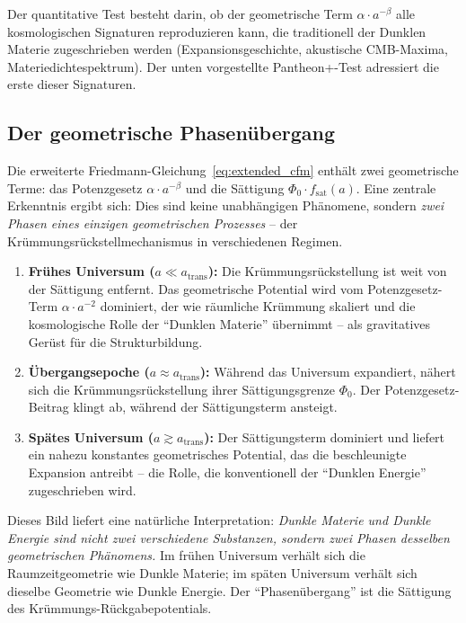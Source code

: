 \documentclass[aps,prd,twocolumn,superscriptaddress,nofootinbib]{revtex4-2}
\begin{document}
Der quantitative Test besteht darin, ob der geometrische Term $\alpha \cdot a^{-\beta}$ alle kosmologischen Signaturen reproduzieren kann, die traditionell der Dunklen Materie zugeschrieben werden (Expansionsgeschichte, akustische CMB-Maxima, Materiedichtespektrum). Der unten vorgestellte Pantheon+-Test adressiert die erste dieser Signaturen.

\subsection{Der geometrische Phasen\"ubergang}
\label{subsec:phase_transition}

Die erweiterte Friedmann-Gleichung~\eqref{eq:extended_cfm} enth\"alt zwei geometrische Terme: das Potenzgesetz $\alpha \cdot a^{-\beta}$ und die S\"attigung $\Phi_0 \cdot f_{\mathrm{sat}}(a)$. Eine zentrale Erkenntnis ergibt sich: Dies sind keine unabh\"angigen Ph\"anomene, sondern \textit{zwei Phasen eines einzigen geometrischen Prozesses} -- der Kr\"ummungsr\"uckstellmechanismus in verschiedenen Regimen.

\begin{enumerate}
\item \textbf{Fr\"uhes Universum ($a \ll a_{\mathrm{trans}}$):} Die Kr\"ummungsr\"uckstellung ist weit von der S\"attigung entfernt. Das geometrische Potential wird vom Potenzgesetz-Term $\alpha \cdot a^{-2}$ dominiert, der wie r\"aumliche Kr\"ummung skaliert und die kosmologische Rolle der "`Dunklen Materie"' \"ubernimmt -- als gravitatives Ger\"ust f\"ur die Strukturbildung.

\item \textbf{\"Ubergangsepoche ($a \approx a_{\mathrm{trans}}$):} W\"ahrend das Universum expandiert, n\"ahert sich die Kr\"ummungsr\"uckstellung ihrer S\"attigungsgrenze $\Phi_0$. Der Potenzgesetz-Beitrag klingt ab, w\"ahrend der S\"attigungsterm ansteigt.

\item \textbf{Sp\"ates Universum ($a \gtrsim a_{\mathrm{trans}}$):} Der S\"attigungsterm dominiert und liefert ein nahezu konstantes geometrisches Potential, das die beschleunigte Expansion antreibt -- die Rolle, die konventionell der "`Dunklen Energie"' zugeschrieben wird.
\end{enumerate}

Dieses Bild liefert eine nat\"urliche Interpretation: \textit{Dunkle Materie und Dunkle Energie sind nicht zwei verschiedene Substanzen, sondern zwei Phasen desselben geometrischen Ph\"anomens.} Im fr\"uhen Universum verh\"alt sich die Raumzeitgeometrie wie Dunkle Materie; im sp\"aten Universum verh\"alt sich dieselbe Geometrie wie Dunkle Energie. Der "`Phasen\"ubergang"' ist die S\"attigung des Kr\"ummungs-R\"uckgabepotentials.
\end{document}
